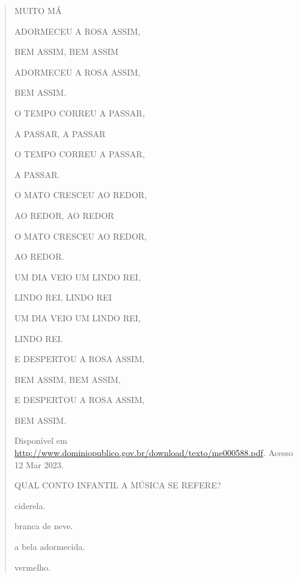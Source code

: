 \begin{verse}
{{MUITO MÁ

ADORMECEU A ROSA ASSIM,

BEM ASSIM, BEM ASSIM

ADORMECEU A ROSA ASSIM,

BEM ASSIM.

O TEMPO CORREU A PASSAR,

A PASSAR, A PASSAR

O TEMPO CORREU A PASSAR,

A PASSAR.

O MATO CRESCEU AO REDOR,

AO REDOR, AO REDOR

O MATO CRESCEU AO REDOR,

AO REDOR.

UM DIA VEIO UM LINDO REI,

LINDO REI, LINDO REI

UM DIA VEIO UM LINDO REI,

LINDO REI.

E DESPERTOU A ROSA ASSIM,

BEM ASSIM, BEM ASSIM,

E DESPERTOU A ROSA ASSIM,

BEM ASSIM.

Disponível em
\url{http://www.dominiopublico.gov.br/download/texto/me000588.pdf}.
Acesso 12 Mar 2023.

QUAL CONTO INFANTIL A MÚSICA SE REFERE?

\begin{escolha}
\item ciderela.

\item branca de neve.

\item a bela adormecida.

\itemchapeuzinho vermelho.
\end{escolha}

}}
\end{verse}
